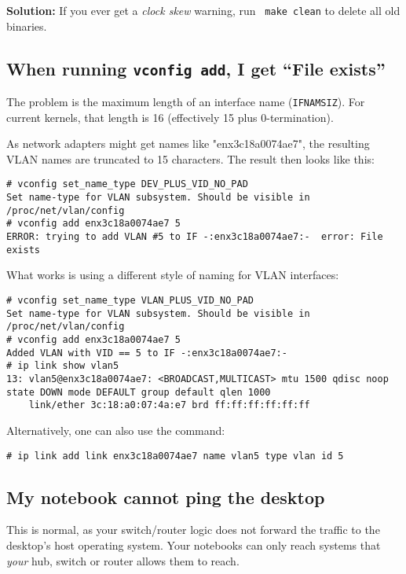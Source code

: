 \documentclass{article}
\begin{document}
{\bf Solution:} If you ever get a {\em clock skew} warning, run {\tt
  make clean} to delete all old binaries.


\subsection{When running {\tt vconfig add}, I get ``File exists''}

The problem is the maximum length of an interface name ({\tt IFNAMSIZ}).
For current kernels, that length is 16 (effectively 15 plus 0-termination).

As network adapters might get names like "enx3c18a0074ae7", the resulting VLAN
names are truncated to 15 characters. The result then looks like this:

\begin{verbatim}
# vconfig set_name_type DEV_PLUS_VID_NO_PAD
Set name-type for VLAN subsystem. Should be visible in /proc/net/vlan/config
# vconfig add enx3c18a0074ae7 5
ERROR: trying to add VLAN #5 to IF -:enx3c18a0074ae7:-  error: File exists
\end{verbatim}

What works is using a different style of naming for VLAN interfaces:

\begin{verbatim}
# vconfig set_name_type VLAN_PLUS_VID_NO_PAD
Set name-type for VLAN subsystem. Should be visible in /proc/net/vlan/config
# vconfig add enx3c18a0074ae7 5
Added VLAN with VID == 5 to IF -:enx3c18a0074ae7:-
# ip link show vlan5
13: vlan5@enx3c18a0074ae7: <BROADCAST,MULTICAST> mtu 1500 qdisc noop state DOWN mode DEFAULT group default qlen 1000
    link/ether 3c:18:a0:07:4a:e7 brd ff:ff:ff:ff:ff:ff
\end{verbatim}

Alternatively, one can also use the command:

\begin{verbatim}
# ip link add link enx3c18a0074ae7 name vlan5 type vlan id 5
\end{verbatim}


\subsection{My notebook cannot ping the desktop}

This is normal, as your switch/router logic does not forward the
traffic to the desktop's host operating system.  Your notebooks can
only reach systems that {\em your} hub, switch or router allows them
to reach.
\end{document}
